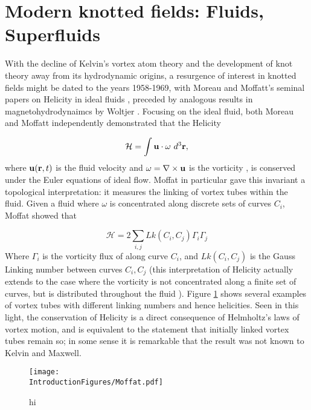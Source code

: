 \section{Modern knotted fields: Fluids, Superfluids}
With the decline of Kelvin's vortex atom theory and the development of knot theory away from its hydrodynamic origins, a resurgence of interest in knotted fields might be dated to the years 1958-1969, with Moreau and Moffatt's seminal papers on Helicity in ideal fluids \cite{Moreau,Moffat}, preceded by analogous results in magnetohydrodynaimcs by Woltjer \cite{Woltjer}. Focusing on the ideal fluid, both Moreau and Moffatt independently demonstrated that the Helicity

\begin{equation}
    \mathcal{H} = \int {\bf u} \cdot {\mathbf{\omega}} \ d^3 \bf r,
\end{equation}
where ${\bf u}({\bf r},t)$ is the fluid velocity and $\omega = \nabla \times \bf u$ is the vorticity \cite{Saffman}, is conserved under the Euler equations of ideal flow. Moffat in particular gave this invariant a topological interpretation: it measures the linking of vortex tubes within the fluid. Given a fluid where $\omega$ is concentrated along discrete sets of curves $C_i$, Moffat showed that

\begin{equation}
    \mathcal{H} = 2 \sum_{i,j} Lk(C_i,C_j) \Gamma_i \Gamma_j 
\end{equation}
Where $\Gamma_i$ is the vorticity flux of along curve $C_i$, and $Lk(C_i,C_j)$ is the Gauss Linking number between curves $C_i, C_j$ (this interpretation of Helicity actually extends to the case where the vorticity is not concentrated along a finite set of curves, but is distributed throughout the fluid \cite{Arnold,Berger,Berger}). Figure \ref{fig:Moffat} shows several examples of vortex tubes with different linking numbers and hence helicities. Seen in this light, the conservation of Helicity is a direct consequence of Helmholtz's laws of vortex motion, and is equivalent to the statement that initially linked vortex tubes remain so; in some sense it is remarkable that the result was not known to Kelvin and Maxwell.
\begin{figure}[htbp]
\centering
\texttt{[image: \\IntroductionFigures/Moffat.pdf]}
\caption{hi }
\label{fig:Moffat}
\end{figure}

